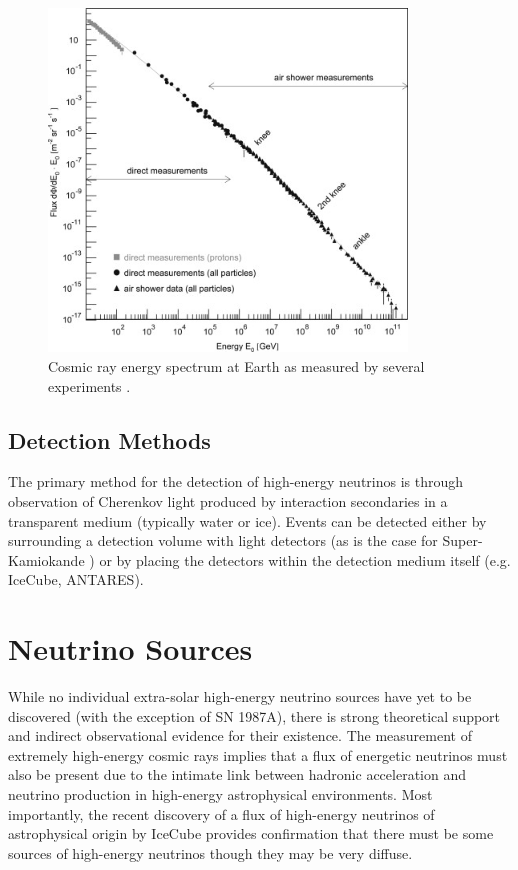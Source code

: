 \documentclass{gatech-thesis}
\begin{document}
\begin{figure}[ht]
  \begin{center}
    \includegraphics[width=0.85\textwidth,keepaspectratio]{CosmicRaySpectrum.jpg}
  \end{center}
  \caption{Cosmic ray energy spectrum at Earth as measured by several experiments \cite{2009PrPNP..63..293B}.}
  \label{fig:cosmicray_spec}
\end{figure}

\section{Detection Methods}

The primary method for the detection of high-energy neutrinos is through observation of Cherenkov light produced by interaction secondaries in a transparent medium (typically water or ice). Events can be detected either by surrounding a detection volume with light detectors (as is the case for Super-Kamiokande \cite{?}) or by placing the detectors within the detection medium itself (e.g. IceCube, ANTARES).
\chapter{Neutrino Sources}
While no individual extra-solar high-energy neutrino sources have yet to be discovered (with the exception of SN 1987A), there is strong theoretical support  and indirect observational evidence for their existence. The measurement of extremely high-energy cosmic rays implies that a flux of energetic neutrinos must also be present due to the intimate link between hadronic acceleration and neutrino production in high-energy astrophysical environments. Most importantly, the recent discovery of a flux of high-energy neutrinos of astrophysical origin by IceCube \cite{2013Sci...342E...1I} provides confirmation that there must be some sources of high-energy neutrinos though they may be very diffuse.
\end{document}
